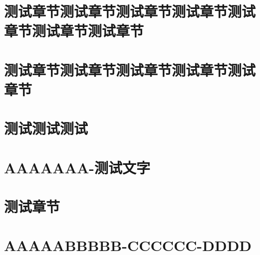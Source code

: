 \documentclass[color=green]{textbook-cn}%
\begin{document}
\part{测试章节测试章节测试章节测试章节测试章节测试章节测试章节}
\part[测试章节]{测试章节测试章节测试章节测试章节测试章节}

\lipsum\lipsum


\part{测试测试测试}



\backmatter

\lipsum

\part*{AAAAAAA-测试文字}
\partintro{\zhlipsum[2]}
\part{测试章节}
\part[BabyBabyBaby]{AAAAABBBBB-CCCCCC-DDDD}


\lipsum
\makeatletter























\lipsum[2]


\makeatother
\end{document}
